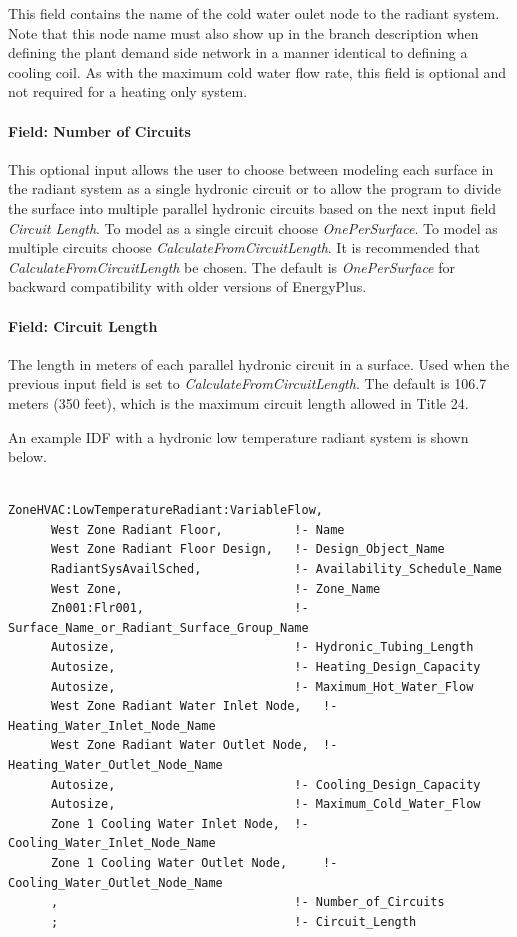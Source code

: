 This field contains the name of the cold water oulet node to the radiant system. Note that this node name must also show up in the branch description when defining the plant demand side network in a manner identical to defining a cooling coil. As with the maximum cold water flow rate, this field is optional and not required for a heating only system.

\paragraph{Field: Number of Circuits}\label{field-number-of-circuits}

This optional input allows the user to choose between modeling each surface in the radiant system as a single hydronic circuit or to allow the program to divide the surface into multiple parallel hydronic circuits based on the next input field \emph{Circuit Length}. To model as a single circuit choose \emph{OnePerSurface}. To model as multiple circuits choose \emph{CalculateFromCircuitLength}. It is recommended that \emph{CalculateFromCircuitLength} be chosen. The default is \emph{OnePerSurface} for backward compatibility with older versions of EnergyPlus.

\paragraph{Field: Circuit Length}\label{field-circuit-length}

The length in meters of each parallel hydronic circuit in a surface. Used when the previous input field is set to \emph{CalculateFromCircuitLength}. The default is 106.7 meters (350 feet), which is the maximum circuit length allowed in Title 24.

An example IDF with a hydronic low temperature radiant system is shown below.

\begin{lstlisting}

ZoneHVAC:LowTemperatureRadiant:VariableFlow,
      West Zone Radiant Floor,          !- Name
      West Zone Radiant Floor Design,   !- Design_Object_Name
      RadiantSysAvailSched,             !- Availability_Schedule_Name
      West Zone,                        !- Zone_Name
      Zn001:Flr001,                     !- Surface_Name_or_Radiant_Surface_Group_Name
      Autosize,                         !- Hydronic_Tubing_Length
      Autosize,                         !- Heating_Design_Capacity
      Autosize,                         !- Maximum_Hot_Water_Flow
      West Zone Radiant Water Inlet Node,   !- Heating_Water_Inlet_Node_Name
      West Zone Radiant Water Outlet Node,  !- Heating_Water_Outlet_Node_Name
      Autosize,                         !- Cooling_Design_Capacity
      Autosize,                         !- Maximum_Cold_Water_Flow
      Zone 1 Cooling Water Inlet Node,  !- Cooling_Water_Inlet_Node_Name
      Zone 1 Cooling Water Outlet Node,     !- Cooling_Water_Outlet_Node_Name
      ,                                 !- Number_of_Circuits
      ;                                 !- Circuit_Length
\end{lstlisting}

